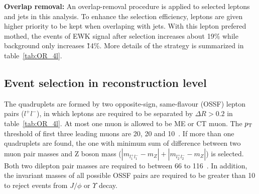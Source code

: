 \textbf{Overlap removal:} 
An overlap-removal procedure is applied to selected leptons and jets in this analysis.
To enhance the selection efficiency, leptons are given higher priority to be kept when overlaping with jets.
With this lepton prefered mothed, the events of EWK signal after selection increases about 19\% while background only increases \~ 14\%.
More details of the strategy is summarized in table~\ref{tab:OR_4l}.
\begin{table}[htbp]
\begin{center}
\renewcommand\arraystretch{1.8}
\end{center}
\caption{Overlap removal criteria between pre-selection objects for the \llll channel. The overlap removal follows the order shown in this table. Once an object has been marked as removed, it does not participate in the subsequent stages of the overlap removal procedure. }
\label{tab:OR_4l}
\end{table}

\subsection{Event selection in reconstruction level}

The \llll quadruplets are formed by two opposite-sign, same-flavour (OSSF) lepton pairs ($l^{+}l^{-}$),
in which leptons are required to be separated by $\Delta R > 0.2$ in table~\ref{tab:OR_4l}.
At most one muon is allowed to be ME or CT muon.
The $p_{\text{T}}$ threshold of first three leading muons are 20, 20 and 10~\gev.
If more than one quadruplets are found, the one with minimum sum of difference between two muon pair masses and Z boson mass 
($|m_{l_{1}^{+}l_{1}^{-}} - m_{Z}| + |m_{l_{2}^{+}l_{2}^{-}} - m_{Z}|$) is selected.
Both two dilepton pair masses are required to between 66 to 116~\gev.
In addition, the invariant masses of all possible OSSF pairs are required to be greater than 10 \gev to reject events from $J/\phi$ or $\Upsilon$ decay.

